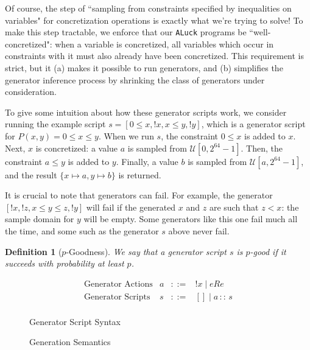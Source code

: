 \documentclass[sigconf,nonacm]{acmart}
\newtheorem{definition}{Definition}
\begin{document}
Of course, the step of ``sampling from constraints specified by inequalities on
variables" for concretization operations is exactly what we're trying to solve!
To make this step tractable, we enforce that our \texttt{ALuck} programs be
``well-concretized": when a variable is concretized, all variables which occur
in constraints with it must also already have been concretized. This requirement
is strict, but it (a) makes it possible to run generators, and (b) simplifies
the generator inference process by shrinking the class of generators under
consideration.

To give some intuition about how these generator scripts work, we consider
running the example script $s = [0 \leq x, !x, x \leq y, !y]$, which is a
generator script for $P(x,y) = 0\leq x \leq y$. When we run $s$, the constraint
$0 \leq x$ is added to $x$. Next, $x$ is concretized: a value $a$ is sampled
from $\mathcal{U}\left[0,2^{64}-1\right]$. Then, the constraint $a \leq y$ is
added to $y$. Finally, a value $b$ is sampled from
$\mathcal{U}\left[a,2^{64}-1\right]$, and the result $\{x \mapsto a, y \mapsto
b\}$ is returned.

It is crucial to note that generators can fail. For example, the generator
$[!x,!z, x \leq y \leq z, !y]$ will fail if the generated $x$ and $z$ are such
that $z < x$:  the sample domain for $y$ will be empty. Some generators like
this one fail much all the time, and some such as the generator $s$ above never
fail.

\begin{definition}[$p$-Goodness]
We say that a generator script $s$ is $p$-good if it succeeds with probability at least $p$.
\end{definition}

\begin{figure}
\caption{Generator Script Syntax}
\label{fig:aluck-syntax}
$$
\begin{array}{llll}
\text{Generator Actions} & a & ::= & !x \;|\; e R e\\
\text{Generator Scripts} & s & ::= & [] \;|\; a \, :: \, s\\
\end{array}
$$
\end{figure}

\begin{figure}
\caption{Generation Semantics}
\label{fig:aluck-semantics}
\begin{mathpar}


\end{mathpar}
\end{figure}
\end{document}
